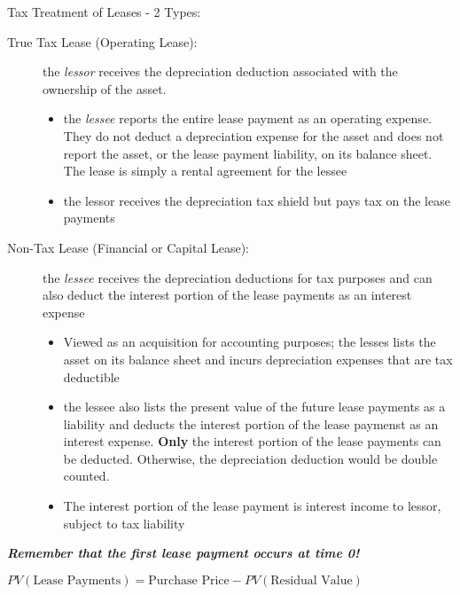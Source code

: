 \documentclass{report}
\begin{document}
Tax Treatment of Leases - 2 Types:
\begin{description}
\item[True Tax Lease (Operating Lease):] the \textit{lessor} receives the depreciation deduction associated with the ownership of the asset.
  \begin{itemize}
  \item the \textit{lessee} reports the entire lease payment as an operating expense. They do not deduct a depreciation expense for the asset and does not report the asset, or the lease payment liability, on its balance sheet. The lease is simply a rental agreement for the lessee
  \item the lessor receives the depreciation tax shield but pays tax on the lease payments
  \end{itemize}
\item[Non-Tax Lease (Financial or Capital Lease):] the \textit{lessee} receives the depreciation deductions for tax purposes and can also deduct the interest portion of the lease payments as an interest expense
  \begin{itemize}
  \item Viewed as an acquisition for accounting purposes; the lesses lists the asset on its balance sheet and incurs depreciation expenses that are tax deductible
  \item the lessee also lists the present value of the future lease payments as a liability and deducts the interest portion of the lease paymenst as an interest expense. \textbf{Only} the interest portion of the lease payments can be deducted. Otherwise, the depreciation deduction would be double counted.
  \item The interest portion of the lease payment is interest income to lessor, subject to tax liability
  \end{itemize}

\end{description}
\textit{\textbf{Remember that the first lease payment occurs at time 0!}}
\vspace*{1\baselineskip}

$PV(\mbox{Lease Payments}) = \mbox{Purchase Price} - PV(\mbox{Residual Value})$
\end{document}
